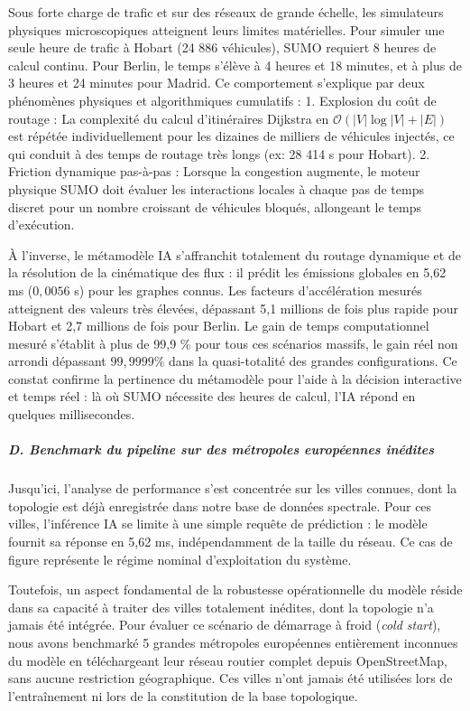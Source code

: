 \documentclass[10pt, a4paper]{article}
\begin{document}
Sous forte charge de trafic et sur des réseaux de grande échelle, les
simulateurs physiques microscopiques atteignent leurs limites
matérielles. Pour simuler une seule heure de trafic à Hobart (24 886
véhicules), SUMO requiert 8 heures de calcul continu. Pour Berlin, le
temps s'élève à 4 heures et 18 minutes, et à plus de 3 heures et 24
minutes pour Madrid. Ce comportement s'explique par deux phénomènes
physiques et algorithmiques cumulatifs : 1. Explosion du coût de routage
: La complexité du calcul d'itinéraires Dijkstra en
\(\mathcal{O}(|V| \log |V| + |E|)\) est répétée individuellement pour
les dizaines de milliers de véhicules injectés, ce qui conduit à des
temps de routage très longs (ex: 28 414 s pour Hobart). 2. Friction
dynamique pas-à-pas : Lorsque la congestion augmente, le moteur physique
SUMO doit évaluer les interactions locales à chaque pas de temps discret
pour un nombre croissant de véhicules bloqués, allongeant le temps
d'exécution.

À l'inverse, le métamodèle IA s'affranchit totalement du routage
dynamique et de la résolution de la cinématique des flux : il prédit les
émissions globales en 5,62 ms (\(0,0056\) s) pour les graphes connus.
Les facteurs d'accélération mesurés atteignent des valeurs très élevées,
dépassant 5,1 millions de fois plus rapide pour Hobart et 2,7 millions
de fois pour Berlin. Le gain de temps computationnel mesuré s'établit à
plus de 99,9 \% pour tous ces scénarios massifs, le gain réel non
arrondi dépassant \(99{,}9999\%\) dans la quasi-totalité des grandes
configurations. Ce constat confirme la pertinence du métamodèle pour
l'aide à la décision interactive et temps réel : là où SUMO nécessite
des heures de calcul, l'IA répond en quelques millisecondes.

\subparagraph{D. Benchmark du pipeline sur des métropoles européennes
inédites}\label{d.-benchmark-du-pipeline-sur-des-muxe9tropoles-europuxe9ennes-inuxe9dites}

Jusqu'ici, l'analyse de performance s'est concentrée sur les villes
connues, dont la topologie est déjà enregistrée dans notre base de
données spectrale. Pour ces villes, l'inférence IA se limite à une
simple requête de prédiction : le modèle fournit sa réponse en 5,62 ms,
indépendamment de la taille du réseau. Ce cas de figure représente le
régime nominal d'exploitation du système.

Toutefois, un aspect fondamental de la robustesse opérationnelle du
modèle réside dans sa capacité à traiter des villes totalement inédites,
dont la topologie n'a jamais été intégrée. Pour évaluer ce scénario de
démarrage à froid (\emph{cold start}), nous avons benchmarké 5 grandes
métropoles européennes entièrement inconnues du modèle en téléchargeant
leur réseau routier complet depuis OpenStreetMap, sans aucune
restriction géographique. Ces villes n'ont jamais été utilisées lors de
l'entraînement ni lors de la constitution de la base topologique.
\end{document}
